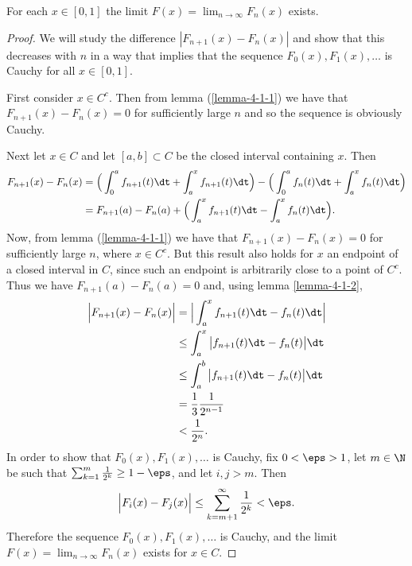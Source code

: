 \begin{enumerate}[label=(4.\arabic*)]
  \begin{claim*}
    For each $x \in [0, 1]$ the limit $F(x) = \lim_{n\to\infty} F_n(x)$ exists.
  \end{claim*}

  \begin{proof}
    We will study the difference $|F_{n+1}(x) - F_n(x)|$ and show that this decreases with $n$ in a way that
    implies that the sequence $F_0(x), F_1(x), \ldots$ is Cauchy for all $x \in [0, 1]$.

    First consider $x \in C^c$. Then from lemma (\ref{lemma-4-1-1}) we have that $F_{n+1}(x) - F_{n}(x) = 0$
    for sufficiently large $n$ and so the sequence is obviously Cauchy.

    Next let $x \in C$ and let $[a, b] \subset C$ be the closed interval containing $x$. Then
    \begin{align*}
      F_{n+1}(x) - F_n(x)
      &= \Big(\int_0^a f_{n+1}(t) \dt + \int_a^x f_{n+1}(t) \dt\Big)
        - \Big(\int_0^a f_{n}(t) \dt   + \int_a^x f_{n}(t) \dt\Big) \\
      &= F_{n+1}(a) - F_{n}(a)
        + \Big(\int_a^x f_{n+1}(t) \dt - \int_a^x f_{n}(t) \dt\Big).
    \end{align*}
    Now, from lemma (\ref{lemma-4-1-1}) we have that $F_{n+1}(x) - F_{n}(x) = 0$ for sufficiently large $n$,
    where $x \in C^c$. But this result also holds for $x$ an endpoint of a closed interval in $C$, since such
    an endpoint is arbitrarily close to a point of $C^c$. Thus we have $F_{n+1}(a) - F_{n}(a) = 0$ and, using
    lemma \ref{lemma-4-1-2},
    \begin{align*}
      \Big|F_{n+1}(x) - F_n(x)\Big|
      &=    \Big|\int_a^x f_{n+1}(t) \dt - f_{n}(t) \dt\Big| \\
      &\leq \int_a^x \big|f_{n+1}(t) \dt - f_{n}(t)\big| \dt \\
      &\leq \int_a^b \big|f_{n+1}(t) \dt - f_{n}(t)\big| \dt \\
      &=    \frac{1}{3}\frac{1}{2^{n-1}} \\
      &<    \frac{1}{2^n}.
    \end{align*}
    In order to show that $F_0(x), F_1(x), \ldots$ is Cauchy, fix $0 < \eps > 1$, let $m \in \N$ be such
    that $\sum_{k=1}^m \frac{1}{2^k} \geq 1 - \eps$, and let $i, j > m$. Then
    \begin{align*}
      \Big|F_i(x) - F_j(x)\Big| \leq \sum_{k=m+1}^\infty \frac{1}{2^k} < \eps.
    \end{align*}
    Therefore the sequence $F_0(x), F_1(x), \ldots$ is Cauchy, and the limit $F(x) = \lim_{n\to\infty} F_n(x)$
    exists for $x \in C$.
  \end{proof}


\end{enumerate}
